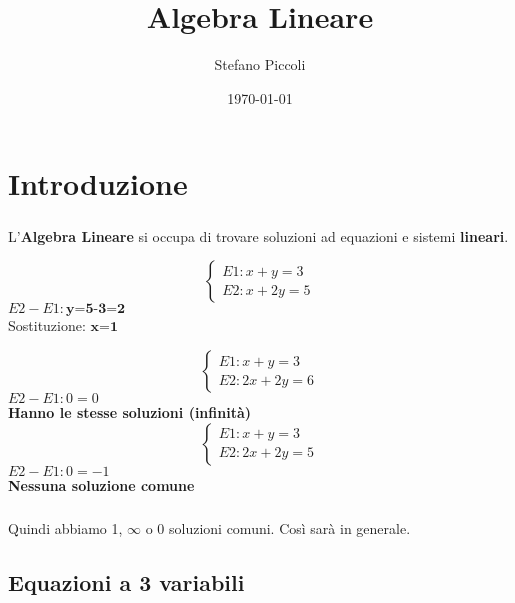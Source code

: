 \documentclass[a4paper, 12pt]{report}
\begin{document}
\title{
\textbf{Algebra Lineare}}
\author{Stefano Piccoli}
\date{\today}
\maketitle
\tableofcontents
	\chapter*{Introduzione}
        \paragraph{}L'\textbf{Algebra Lineare} si occupa di trovare soluzioni ad equazioni e sistemi \textbf{lineari}.
            \begin{center} 
                $$\begin{cases}
                    E1: x+y=3\\
                    E2: x+2y=5
                \end{cases}$$            
                $E2-E1: \textbf{y=5-3=2}$\\
                Sostituzione: $\textbf{x=1}$
            
                $$\begin{cases}
                    E1: x+y=3\\
                    E2: 2x+2y=6
                \end{cases}$$
                $E2-E1:0=0$\\
                \textbf{Hanno le stesse soluzioni (infinità)}\\
            
                $$\begin{cases}
                    E1: x+y=3\\
                    E2: 2x+2y=5
                \end{cases}$$
                $E2-E1: 0=-1$\\
                \textbf{Nessuna soluzione comune} 
            \end{center}
        \paragraph{}Quindi abbiamo 1, $\infty$ o 0 soluzioni comuni. Così sarà in generale. 
        \section{Equazioni a 3 variabili}
\end{document}
